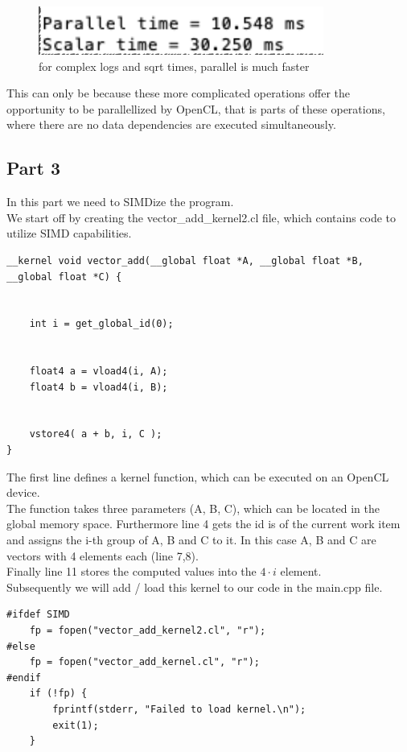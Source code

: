 \documentclass{article}
\begin{document}
\begin{figure}[H]
    \centering
    \includegraphics[scale=0.6]{logs_andsqrt.png} 
    \caption{for complex logs and sqrt times, parallel is much faster}
    \label{fig:graph}
\end{figure}

This can only be because these more complicated operations offer the opportunity to be parallellized by OpenCL, that is parts of these operations, where there are no data dependencies are executed simultaneously.

\subsection*{Part 3}
In this part we need to SIMDize the program. \\
We start off by creating the vector\_add\_kernel2.cl file,
which contains code to utilize SIMD capabilities.

\begin{lstlisting}[caption=vector\_add\_kernel2.cl]
    __kernel void vector_add(__global float *A, __global float *B, __global float *C) {
    
    
    int i = get_global_id(0);

    
    float4 a = vload4(i, A);
    float4 b = vload4(i, B);

    
    vstore4( a + b, i, C );
}
\end{lstlisting}
\noindent The first line defines a kernel function, which can be executed on an OpenCL device. \\
The function takes three parameters (A, B, C), which can be located in the global memory space.
Furthermore line 4 gets the id is of the current work item and assigns the i-th group of A, B and C to it.
In this case A, B and C are vectors with 4 elements each (line 7,8). \\
Finally line 11 stores the computed values into the $4 \cdot i$ element. \\
\newpage
\noindent Subsequently we will add / load this kernel to our code in the main.cpp file.

\begin{lstlisting}[caption=main.cpp]
#ifdef SIMD
    fp = fopen("vector_add_kernel2.cl", "r");
#else
    fp = fopen("vector_add_kernel.cl", "r");
#endif
    if (!fp) {
        fprintf(stderr, "Failed to load kernel.\n");
        exit(1);
    }
\end{lstlisting}
\end{document}
